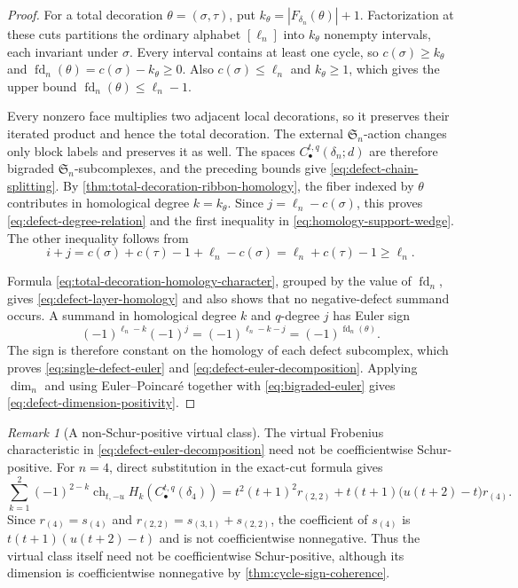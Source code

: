 \documentclass{amsart}
\theoremstyle{definition}
\theoremstyle{remark}
\newtheorem{remark}[remark]{Remark}
\begin{document}
\begin{proof}
For a total decoration $\theta=(\sigma,\tau)$, put
$k_\theta=|F_{\delta_n}(\theta)|+1$.  Factorization at these cuts partitions
the ordinary alphabet $[\ell_n]$ into $k_\theta$ nonempty intervals, each
invariant under $\sigma$.  Every interval contains at least one cycle, so
$c(\sigma)\geq k_\theta$ and
$\operatorname{fd}_n(\theta)=c(\sigma)-k_\theta\geq0$.  Also
$c(\sigma)\leq\ell_n$ and $k_\theta\geq1$, which gives the upper bound
$\operatorname{fd}_n(\theta)\leq\ell_n-1$.

Every nonzero face multiplies two adjacent local decorations, so it preserves
their iterated product and hence the total decoration.  The external
$\mathfrak S_n$-action changes only block labels and preserves it as well.
The spaces $C_\bullet^{t,q}(\delta_n;d)$ are therefore bigraded
$\mathfrak S_n$-subcomplexes, and the preceding bounds give
\eqref{eq:defect-chain-splitting}.  By
\cref{thm:total-decoration-ribbon-homology}, the fiber indexed by $\theta$
contributes in homological degree $k=k_\theta$.  Since
$j=\ell_n-c(\sigma)$, this proves \eqref{eq:defect-degree-relation} and the
first inequality in \eqref{eq:homology-support-wedge}.  The other inequality follows from
\[
 i+j=c(\sigma)+c(\tau)-1+\ell_n-c(\sigma)
     =\ell_n+c(\tau)-1\geq\ell_n.
\]

Formula \eqref{eq:total-decoration-homology-character}, grouped by the value
of $\operatorname{fd}_n$, gives \eqref{eq:defect-layer-homology} and also
shows that no negative-defect summand occurs.  A summand in homological degree
$k$ and $q$-degree $j$ has Euler sign
\[
 (-1)^{\ell_n-k}(-1)^j
 =(-1)^{\ell_n-k-j}
 =(-1)^{\operatorname{fd}_n(\theta)}.
\]
The sign is therefore constant on the homology of each defect subcomplex,
which proves \eqref{eq:single-defect-euler} and
\eqref{eq:defect-euler-decomposition}.  Applying $\dim_n$ and using
Euler--Poincar\'e together with \eqref{eq:bigraded-euler} gives
\eqref{eq:defect-dimension-positivity}.
\end{proof}

\begin{remark}[A non-Schur-positive virtual class]
The virtual Frobenius characteristic in
\eqref{eq:defect-euler-decomposition} need not be coefficientwise
Schur-positive.  For $n=4$, direct substitution in the exact-cut formula gives
\[
 \sum_{k=1}^{2}(-1)^{2-k}
 \operatorname{ch}_{t,-u}H_k(C_\bullet^{t,q}(\delta_4))
 =t^2(t+1)^2r_{(2,2)}
  +t(t+1)\bigl(u(t+2)-t\bigr)r_{(4)}.
\]
Since $r_{(4)}=s_{(4)}$ and
$r_{(2,2)}=s_{(3,1)}+s_{(2,2)}$, the coefficient of $s_{(4)}$ is
$t(t+1)(u(t+2)-t)$ and is not coefficientwise nonnegative.  Thus the virtual
class itself need not be coefficientwise Schur-positive, although its
dimension is coefficientwise nonnegative by
\cref{thm:cycle-sign-coherence}.
\end{remark}
\end{document}
